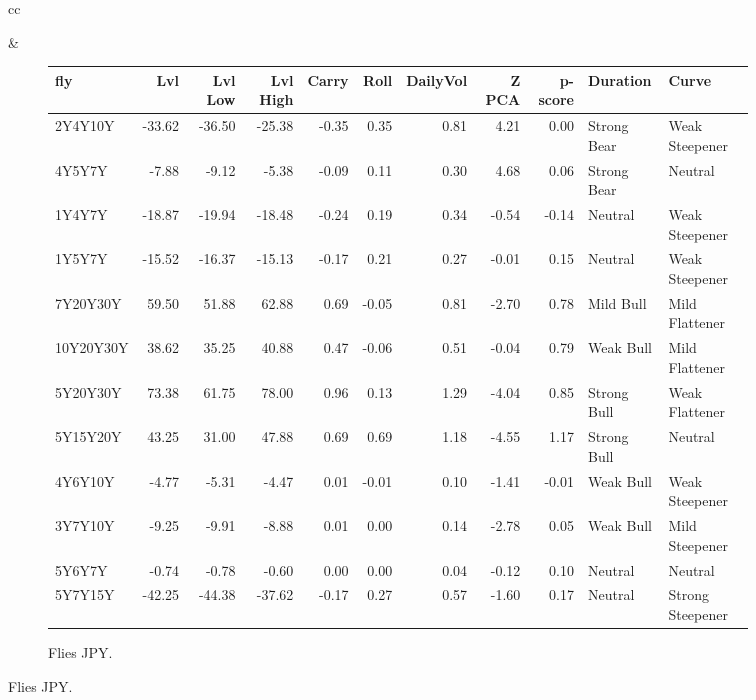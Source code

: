 \documentclass[a4paper,twoside]{report}
\begin{document}
\begin{figure}[htbp]
\begin{tabular}[c]{cc}
 
\begin{subfigure}[c]{0.5\textwidth}
 
 \end{subfigure}&
 
 \begin{subfigure}[c]{0.5\textwidth}
 \caption{Flies JPY.}
 \label{fig:Flies JPY}
 \begin{adjustbox}{max width=\textwidth}
 \begin{tabular}{lrrrrrrrrll}
\hline
       fly &    Lvl &  Lvl Low &  Lvl High &  Carry &  Roll &  DailyVol &  Z PCA &  p-score &     Duration &             Curve \\
\hline
   2Y4Y10Y & -33.62 &   -36.50 &    -25.38 &  -0.35 &  0.35 &      0.81 &   4.21 &     0.00 &  Strong Bear &    Weak Steepener \\
    4Y5Y7Y &  -7.88 &    -9.12 &     -5.38 &  -0.09 &  0.11 &      0.30 &   4.68 &     0.06 &  Strong Bear &           Neutral \\
    1Y4Y7Y & -18.87 &   -19.94 &    -18.48 &  -0.24 &  0.19 &      0.34 &  -0.54 &    -0.14 &      Neutral &    Weak Steepener \\
    1Y5Y7Y & -15.52 &   -16.37 &    -15.13 &  -0.17 &  0.21 &      0.27 &  -0.01 &     0.15 &      Neutral &    Weak Steepener \\
  7Y20Y30Y &  59.50 &    51.88 &     62.88 &   0.69 & -0.05 &      0.81 &  -2.70 &     0.78 &    Mild Bull &    Mild Flattener \\
 10Y20Y30Y &  38.62 &    35.25 &     40.88 &   0.47 & -0.06 &      0.51 &  -0.04 &     0.79 &    Weak Bull &    Mild Flattener \\
  5Y20Y30Y &  73.38 &    61.75 &     78.00 &   0.96 &  0.13 &      1.29 &  -4.04 &     0.85 &  Strong Bull &    Weak Flattener \\
  5Y15Y20Y &  43.25 &    31.00 &     47.88 &   0.69 &  0.69 &      1.18 &  -4.55 &     1.17 &  Strong Bull &           Neutral \\
   4Y6Y10Y &  -4.77 &    -5.31 &     -4.47 &   0.01 & -0.01 &      0.10 &  -1.41 &    -0.01 &    Weak Bull &    Weak Steepener \\
   3Y7Y10Y &  -9.25 &    -9.91 &     -8.88 &   0.01 &  0.00 &      0.14 &  -2.78 &     0.05 &    Weak Bull &    Mild Steepener \\
    5Y6Y7Y &  -0.74 &    -0.78 &     -0.60 &   0.00 &  0.00 &      0.04 &  -0.12 &     0.10 &      Neutral &           Neutral \\
   5Y7Y15Y & -42.25 &   -44.38 &    -37.62 &  -0.17 &  0.27 &      0.57 &  -1.60 &     0.17 &      Neutral &  Strong Steepener \\

\end{tabular}
\end{adjustbox}
\end{subfigure}
\end{tabular}
\end{figure}
\end{document}
